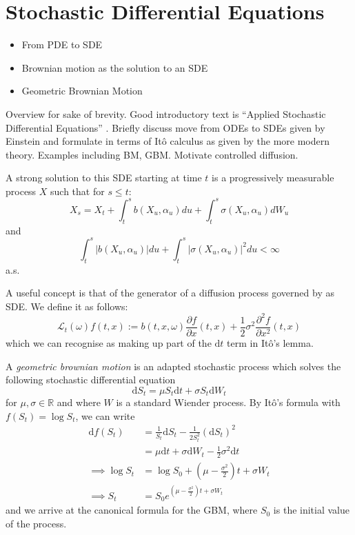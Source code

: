 \section{Stochastic Differential Equations}\label{sec:1.6}
\begin{itemize}
    \item From PDE to SDE
    \item Brownian motion as the solution to an SDE
    \item Geometric Brownian Motion
\end{itemize}

Overview for sake of brevity. Good introductory text is ``Applied Stochastic
Differential Equations'' \cite{ASDEs}. Briefly discuss move from ODEs to SDEs given by 
Einstein and formulate in terms of It\^{o} calculus as given by the more modern theory. Examples
including BM, GBM. Motivate controlled diffusion.

\begin{definition}
    A strong solution to this SDE starting at time $t$ is a progressively measurable process $X$ such that for $s\leq t$:
    $$X_s=X_t+\int_{t}^{s}b(X_u,\alpha_u)du+\int_t^s\sigma(X_u,\alpha_u)dW_u$$
    and
    $$\int_t^s|b(X_u,\alpha_u)|du+\int_t^s|\sigma(X_u,\alpha_u)|^2du<\infty$$
    a.s.
\end{definition}

\begin{definition}
    A useful concept is that of the generator of a diffusion process governed by 
    as SDE. We define it as follows:
    \begin{equation}
        \mathcal{L}_t(\omega)f(t,x):=b(t,x,\omega)\frac{\partial f}{\partial x}(t,x)+\frac{1}{2}\sigma^2\frac{\partial^2f}{\partial x^2}(t,x)
    \end{equation}
    which we can recognise as making up part of the $\mathrm dt$ term in It\^{o}'s lemma.
\end{definition}

\begin{definition}
    A \emph{geometric brownian motion} is an adapted stochastic process which solves the following
    stochastic differential equation
    \begin{equation}
        \mathrm dS_t=\mu S_t\mathrm dt + \sigma S_t\mathrm dW_t
    \end{equation}
    for $\mu,\sigma\in\mathbb{R}$ and where $W$ is a standard Wiender process.
    By It\^{o}'s formula with $f(S_t)=\log S_t$, we can write
    \begin{align*}
        \mathrm df(S_t)&=\frac{1}{S_t}\mathrm dS_t-\frac{1}{2S_t^2}(\mathrm dS_t)^2\\
        &=\mu\mathrm dt+\sigma\mathrm dW_t-\frac{1}{2}\sigma^2\mathrm dt\\
        \implies \log S_t&=\log S_0+\left(\mu-\frac{\sigma^2}{2}\right)t+\sigma W_t\\
        \implies S_t&=S_0e^{\left(\mu-\frac{\sigma^2}{2}\right)t+\sigma W_t}
    \end{align*}
    and we arrive at the canonical formula for the GBM, where $S_0$ is the initial value of the process.
\end{definition}
